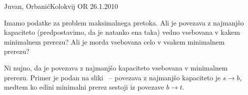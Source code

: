 \begin{naloga}{Juvan, Orbanić}{Kolokvij OR 26.1.2010}
\begin{vprasanje}
Imamo podatke za problem maksimalnega pretoka.
Ali je povezava z najmanjšo kapaciteto
(predpostavimo, da je natanko ena taka)
vedno vsebovana v kakem minimalnem prerezu?
Ali je morda vsebovana celo v vsakem minimalnem prerezu?
\end{vprasanje}

\begin{odgovor}
Ni nujno,
da je povezava z najmanjšo kapaciteto vsebovana v minimalnem prerezu.
Primer je podan na sliki~\fig{}
-- povezava z najmanjšo kapaciteto je $s \to b$,
medtem ko edini minimalni prerez sestoji iz povezave $b \to t$.

\begin{slika}
\pgfslika
{}
\end{slika}
\end{odgovor}
\end{naloga}
